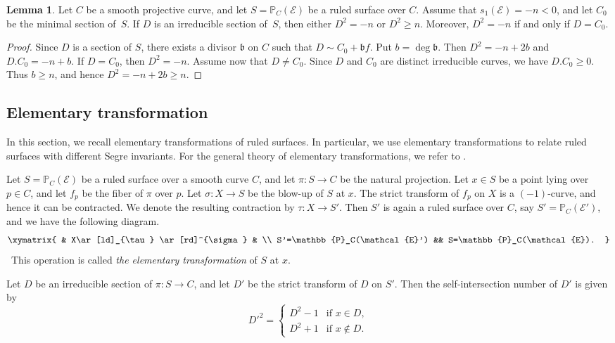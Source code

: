 \documentclass[reqno]{amsart}
\theoremstyle{definition}
\newtheorem{Lemma}[Thm]{Lemma}
\newcommand{\PP}{\mathbb{P}}
\newcommand{\Ee}{\mathcal{E}}
\newcommand{\Oo}{\mathcal{O}}
\newcommand{\bb}{\mathfrak{b}}
\newcommand{\tS}{X}
\begin{document}

\begin{Lemma}\label{section-self-intersection}
Let $C$ be a smooth projective curve, and let $S=\PP_C(\Ee)$ be a ruled surface over $C$.
Assume that $s_1(\Ee)=-n<0$, and let $C_0$ be the minimal section of~$S$.
If $D$ is an irreducible section of~$S$, then either $D^2=-n$ or $D^2\geq n$.
Moreover, $D^2=-n$ if and only if $D=C_0$.
\end{Lemma}

\begin{proof}
Since $D$ is a section of $S$, there exists a divisor $\bb$ on $C$ such that $D\sim C_0+\bb f$.
Put $b=\deg \bb$.
Then $D^2=-n+2b$ and $D.C_0=-n+b$.
If $D=C_0$, then $D^2=-n$.
Assume now that $D\neq C_0$.
Since $D$ and $C_0$ are distinct irreducible curves, we have $D.C_0\geq 0$.
Thus $b\geq n$, and hence $D^2=-n+2b\geq n$.
\end{proof}

\subsection{Elementary transformation}

In this section, we recall elementary transformations of ruled surfaces.
In particular, we use elementary transformations to relate ruled surfaces with different Segre invariants.
For the general theory of elementary transformations, we refer to \cite{Mar82}.

Let $S=\PP_C(\Ee)$ be a ruled surface over a smooth curve $C$, and let $\pi:S\to C$ be the natural projection.
Let $x\in S$ be a point lying over $p\in C$, and let $f_p$ be the fiber of $\pi$ over $p$.
Let $\sigma:\tS\to S$ be the blow-up of $S$ at $x$.
The strict transform of $f_p$ on $\tS$ is a $(-1)$-curve, and hence it can be contracted.
We denote the resulting contraction by $\tau:\tS\to S'$.
Then $S'$ is again a ruled surface over $C$, say $S'=\PP_C(\Ee')$, and we have the following diagram.
\[
\xymatrix{
& \tS \ar[ld]_{\tau} \ar[rd]^{\sigma} & \\
S'=\PP_C(\Ee') && S=\PP_C(\Ee).
}
\]\
This operation is called \emph{the elementary transformation} of $S$ at $x$.

Let $D$ be an irreducible section of $\pi: S\to C$, and let $D'$ be the strict transform of $D$ on $S'$.
Then the self-intersection number of $D'$ is given by
\[
D'^2=
\begin{cases}
D^2-1 & \text{if $x\in D$},\\
D^2+1 & \text{if $x\notin D$}.
\end{cases}
\]
\end{document}
